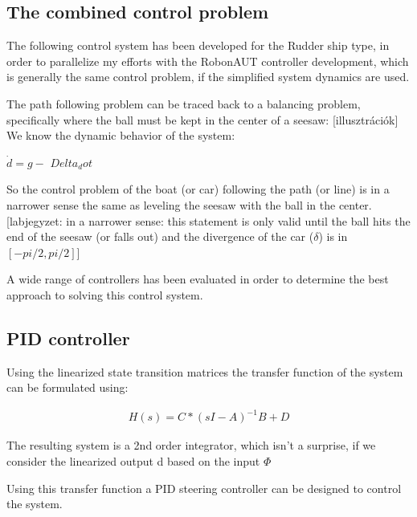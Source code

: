 \subsection{The combined control problem}

The following control system has been developed for the Rudder ship type, in order to parallelize my efforts with the RobonAUT controller development, which is generally the same control problem, if the simplified system dynamics are used.

The path following problem can be traced back to a balancing problem, specifically where the ball must be kept in the center of a seesaw: [illusztrációk]
We know the dynamic behavior of the system:

$\dot{d} = g-$
$Delta_dot$

So the control problem of the boat (or car) following the path (or line) is in a narrower sense the same as leveling the seesaw with the ball in the center. [labjegyzet: in a narrower sense: this statement is only valid until the ball hits the end of the seesaw (or falls out) and the divergence of the car ($\delta$) is in $[-pi/2, pi/2]$]

A wide range of controllers has been evaluated in order to determine the best approach to solving this control system.

\subsection{PID controller}
Using the linearized state transition matrices the transfer function of the system can be formulated using:

\begin{align}
	H(s) = C*(sI - A)^{-1}B + D
\end{align}

The resulting system is a 2nd order integrator, which isn’t a surprise, if we consider the linearized output d based on the input $\Phi$

Using this transfer function a PID steering controller can be designed to control the system.

